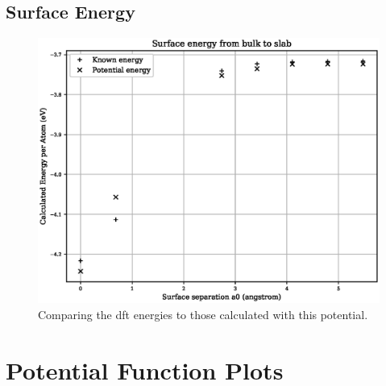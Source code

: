 \clearpage
\subsection{Surface Energy}

\begin{figure}[htb]
\centering
\includegraphics[width=.65\linewidth]{chapters/potentials_fe_pd_ru/fepd_potential/fe_surface_energy.eps}  
\caption{Comparing the \acrshort{dft} energies to those calculated with this potential.}
\label{fig:fepd-fefcc-rose}
\end{figure}





\clearpage
\FloatBarrier
\section{Potential Function Plots}

